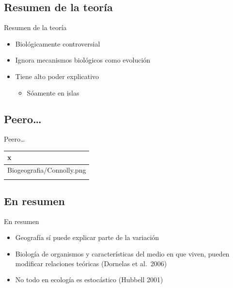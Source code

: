 \documentclass[
  11pt,
  ignorenonframetext,
]{beamer}
\providecommand{\tightlist}{%
  \setlength{\itemsep}{0pt}\setlength{\parskip}{0pt}}
\begin{document}
\hypertarget{resumen-de-la-teoruxeda}{%
\subsection{Resumen de la teoría}\label{resumen-de-la-teoruxeda}}

\begin{frame}{Resumen de la teoría}
\begin{itemize}
\item
  Biológicamente controversial
\item
  Ignora mecanismos biológicos como evolución
\item
  Tiene alto poder explicativo

  \begin{itemize}
  \tightlist
  \item
    Sóamente en islas
  \end{itemize}
\end{itemize}
\end{frame}

\hypertarget{peero}{%
\subsection{Peero\ldots{}}\label{peero}}

\begin{frame}{Peero\ldots{}}
\begin{longtable}[]{@{}l@{}}
\toprule\noalign{}
x \\
\midrule\noalign{}
\endhead
Biogeografia/Connolly.png \\
\bottomrule\noalign{}
\end{longtable}
\end{frame}

\hypertarget{en-resumen}{%
\subsection{En resumen}\label{en-resumen}}

\begin{frame}{En resumen}
\begin{itemize}
\item
  Geografía sí puede explicar parte de la variación
\item
  Biología de organismos y características del medio en que viven,
  pueden modificar relaciones teóricas (Dornelas et al.~2006)
\item
  No todo en ecología es estocástico (Hubbell 2001)
\end{itemize}
\end{frame}
\end{document}
